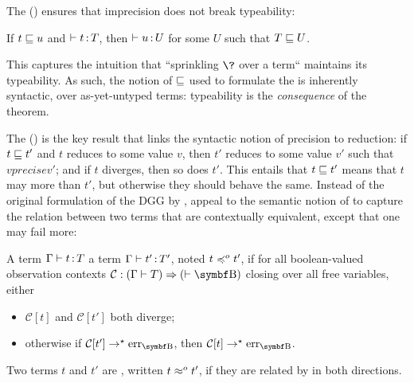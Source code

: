 \AP The  ()
ensures that imprecision does not break typeability:
\begin{property}
If $t \sqsubseteq u$ and $\vdash t \operatorname{:} T$, then $\vdash u \operatorname{:} U$
for some $U$ such that $T \sqsubseteq U$.
\end{property}
%
This  captures the intuition that “sprinkling $\?$ over a term“
maintains its typeability. As such, the notion of  $\sqsubseteq$ used to
formulate the  is inherently syntactic,
over as-yet-untyped terms: typeability is the \emph{consequence} of the  theorem.

\AP The  () is the key result that
links the syntactic notion of precision to reduction:
if $t \sqsubseteq t'$ and $t$ reduces to some value $v$, then
$t'$ reduces to some value $v'$ such that $v precise v'$;
and if $t$ diverges, then so does $t'$.
This  entails that $t \sqsubseteq t'$ means that $t$ may  more than $t'$,
but otherwise they should behave the same.
%
Instead of the original formulation of the DGG by
\textcite{Siek2015},  appeal to the
semantic notion of  to capture
the relation between two terms that are contextually equivalent, except
that one may fail more:%

\begin{definition}
\label{def:obsapprox}
  A term $\Gamma \vdash t \operatorname{:} T$ 
  a term $\Gamma \vdash t' \operatorname{:} T'$, noted $ t
  \preccurlyeq^{o} t'$, if for all boolean-valued observation contexts
  $\mathcal{C} : (\Gamma \vdash T) \Rightarrow (\vdash \Bool)$
  closing over all free variables, either
  \begin{itemize}
  \item $\mathcal{C}[t]$ and $\mathcal{C}[t']$ both diverge; 
  \item otherwise if $\mathcal{C}[t'] \red \err[\Bool]$, then $\mathcal{C}[t] \red \err[\Bool]$.
  \end{itemize}

  Two terms $t$ and $t'$ are , written $t \approx^{o} t'$,
  if they are related by  in both directions.
\end{definition}

